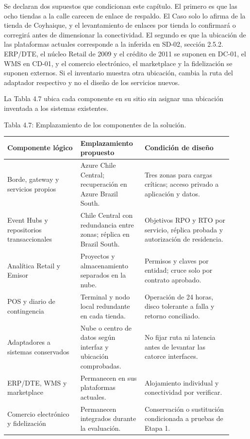 \documentclass[11pt]{article}
\begin{document}
Se declaran dos supuestos que condicionan este capítulo. El primero es que las ocho tiendas a la calle carecen de enlace de respaldo. El Caso solo lo afirma de la tienda de Coyhaique, y el levantamiento de enlaces por tienda lo confirmará o corregirá antes de dimensionar la conectividad. El segundo es que la ubicación de las plataformas actuales corresponde a la inferida en SD-02, sección 2.5.2. ERP/DTE, el núcleo Retail de 2009 y el crédito de 2011 se suponen en DC-01, el WMS en CD-01, y el comercio electrónico, el marketplace y la fidelización se suponen externos. Si el inventario muestra otra ubicación, cambia la ruta del adaptador respectivo y no el diseño de los servicios nuevos.

La Tabla 4.7 ubica cada componente en su sitio sin asignar una ubicación inventada a los sistemas existentes.

Tabla 4.7: Emplazamiento de los componentes de la solución.

\begin{longtable}{@{}p{0.30\linewidth}p{0.26\linewidth}p{0.36\linewidth}@{}}
\toprule Componente lógico & Emplazamiento propuesto & Condición de diseño \\
\midrule\endhead\bottomrule\endlastfoot
Borde, gateway y servicios propios & Azure Chile Central; recuperación en Azure Brazil South. & Tres zonas para cargas críticas; acceso privado a aplicación y datos. \\
Event Hubs y repositorios transaccionales & Chile Central con redundancia entre zonas; réplica en Brazil South. & Objetivos RPO y RTO por servicio, réplica probada y autorización de residencia. \\
Analítica Retail y Emisor & Proyectos y almacenamiento separados en la nube. & Permisos y claves por entidad; cruce solo por contrato aprobado. \\
POS y diario de contingencia & Terminal y nodo local redundante en cada tienda. & Operación de 24 horas, disco tolerante a falla y retorno conciliado. \\
Adaptadores a sistemas conservados & Nube o centro de datos según interfaz y ubicación comprobadas. & No fijar ruta ni latencia antes de levantar las catorce interfaces. \\
ERP/DTE, WMS y marketplace & Permanecen en sus plataformas actuales. & Alojamiento individual y conectividad por verificar. \\
Comercio electrónico y fidelización & Permanecen integrados durante la evaluación. & Conservación o sustitución condicionada a pruebas de Etapa 1. \\
\end{longtable}
\end{document}
